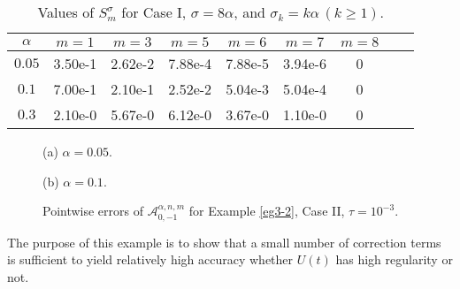 \documentclass[10pt]{siamltex}
\begin{document}
\begin{table}[!h]
\caption{Values of $S^{\sigma}_{m}$ for Case I, $\sigma=8\alpha$, and $\sigma_k=k\alpha\,(k\geq 1)$.\label{tb2-3}}
 \centering\footnotesize
\begin{tabular}{|c|c|c|c |c | c|c|c|c|}\hline
$\alpha$&   $m=1$   &  $m=3$  &  $m=5$  &   $m=6$   &  $m=7$  &  $m=8$ \\ \hline
$0.05$&3.50e-1&2.62e-2&7.88e-4&7.88e-5&3.94e-6&0 \\ \hline
$0.1$ &7.00e-1&2.10e-1&2.52e-2&5.04e-3&5.04e-4&0 \\ \hline
$0.3$ &2.10e-0&5.67e-0&6.12e-0&3.67e-0&1.10e-0&0 \\ \hline
\end{tabular}%
\end{table}



\begin{figure}[!h]
\begin{center}
\begin{minipage}{0.49\textwidth}\centering
{}  \par{(a)   $\alpha = 0.05$.}
\end{minipage}
\begin{minipage}{0.49\textwidth}\centering
{}   \par{(b) $\alpha = 0.1$.}
\end{minipage}
\end{center}
\caption{Pointwise errors of $\mathcal{A}_{0,-1}^{\alpha,n,m}$  for Example \ref{eg3-2}, Case II, $\tau=10^{-3}$.\label{fig2-2-2}}
\end{figure}

The purpose of this example is to show that a small number of correction terms is sufficient to  yield relatively high accuracy whether $U(t)$ has high regularity or not.
\end{document}
